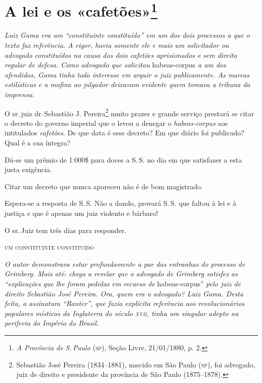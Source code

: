\chapter{A lei e os «cafetões»\footnote{\emph{A Província de S.\,Paulo} (\textsc{sp}), Seção Livre, 21/01/1880, p. 2.}}

\begin{resumo}
\emph{Luiz Gama era um ``constituinte constituído'' em um dos dois
processos a que o texto faz referência. A rigor, havia somente ele e
mais um solicitador ou advogado constituídos na causa dos dois cafetões
aprisionados e sem direito regular de defesa. Como advogado que
solicitou} habeas-corpus \emph{a um dos ofendidos, Gama tinha todo
interesse em arguir o juiz publicamente. As marcas estilísticas e a
mofina ao julgador deixavam evidente quem tomava a tribuna da imprensa.}
\end{resumo}

O sr.\,juiz dr.\,Sebastião J. Pereira\footnote{Sebastião José Pereira \label{sjp}
  (1834--1881), nascido em São Paulo (\textsc{sp}), foi advogado, juiz de direito
  e presidente da província de São Paulo (1875--1878).}
muito prazer e grande
serviço prestará se citar o decreto do governo imperial que o levou a
denegar o \emph{habeas-corpus} aos intitulados \emph{cafetões}. De que
data é esse decreto? Em que diário foi publicado? Qual é a sua íntegra?

Dá-se um prêmio de 1:000\$ para doces a S.\,S. no dia em que satisfazer a
esta justa exigência.

Citar um decreto que nunca apareceu não é de bom magistrado.

Espera-se a resposta de S.\,S. Não a dando, provará S.\,S. que faltou à
lei e à justiça e que é apenas um juiz violento e bárbaro!

O sr.\,Juiz tem três dias para responder.\medskip

\hfill\textsc{um constituinte constituído}


\begin{resumo}
\emph{O autor demonstrava estar profundamente a par das entranhas do
processo de Grimberg. Mais até: chega a revelar que o advogado de
Grimberg satisfez as ``explicações que lhe foram pedidas em recurso de}
habeas-corpus'' \emph{pelo juiz de direito Sebastião José Pereira. Ora,
quem era o advogado? Luiz Gama. Desta feita, a assinatura ``Ranter'', que
fazia explícita referência aos revolucionários populares místicos da
Inglaterra do século \textsc{xvii}, tinha um singular adepto na periferia do
Império do Brasil.}
\end{resumo}

